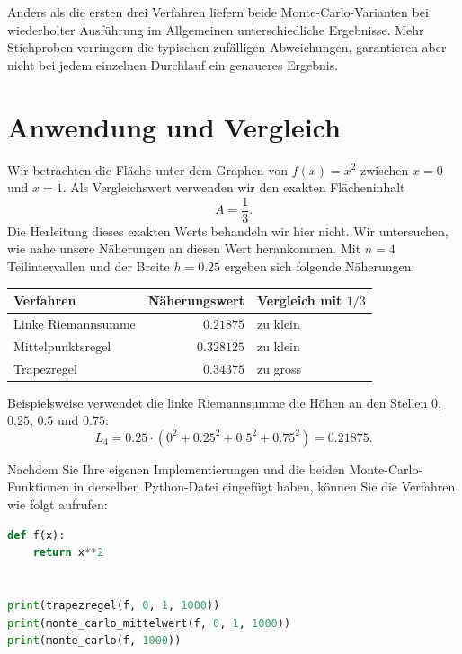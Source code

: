 Anders als die ersten drei Verfahren liefern beide Monte-Carlo-Varianten bei wiederholter Ausführung im Allgemeinen unterschiedliche Ergebnisse. Mehr Stichproben verringern die typischen zufälligen Abweichungen, garantieren aber nicht bei jedem einzelnen Durchlauf ein genaueres Ergebnis.

\section{Anwendung und Vergleich}

\begin{myexample}\label{ex:quadratur-quadratfunktion}
Wir betrachten die Fläche unter dem Graphen von $f(x)=x^2$ zwischen $x=0$ und $x=1$. Als Vergleichswert verwenden wir den exakten Flächeninhalt
\[
    A = \frac{1}{3}.
\]
Die Herleitung dieses exakten Werts behandeln wir hier nicht. Wir untersuchen, wie nahe unsere Näherungen an diesen Wert herankommen.
Mit $n=4$ Teilintervallen und der Breite $h=0.25$ ergeben sich folgende Näherungen:
\begin{center}
    \begin{tabular}{lrl}
        \toprule
        Verfahren & Näherungswert & Vergleich mit $1/3$ \\
        \midrule
        Linke Riemannsumme & $0.21875$ & zu klein \\
        Mittelpunktsregel & $0.328125$ & zu klein \\
        Trapezregel & $0.34375$ & zu gross \\
        \bottomrule
    \end{tabular}
\end{center}
Beispielsweise verwendet die linke Riemannsumme die Höhen an den Stellen $0$, $0.25$, $0.5$ und $0.75$:
\[
    L_4 = 0.25\cdot\left(0^2+0.25^2+0.5^2+0.75^2\right)=0.21875.
\]
\end{myexample}

Nachdem Sie Ihre eigenen Implementierungen und die beiden Monte-Carlo-Funktionen in derselben Python-Datei eingefügt haben, können Sie die Verfahren wie folgt aufrufen:

\begin{lstlisting}[language=Python, caption={Anwendung auf die Funktion f(x) = x**2}, label={lst:quadratur-anwendung}]
def f(x):
    return x**2


print(trapezregel(f, 0, 1, 1000))
print(monte_carlo_mittelwert(f, 0, 1, 1000))
print(monte_carlo(f, 1000))
\end{lstlisting}

